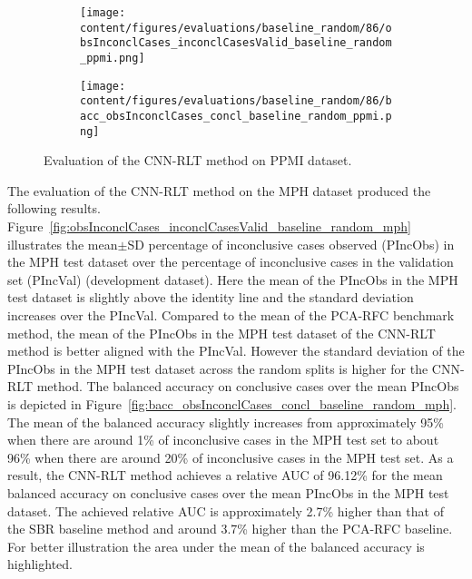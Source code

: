 \begin{figure}[ht]
  \begin{subfigure}{0.9\textwidth}
    \centering
    \texttt{[image: content/figures/evaluations/baseline\_random/86/obsInconclCases\_inconclCasesValid\_baseline\_random\_ppmi.png]}
    \label{fig:obsInconclCases_inconclCasesValid_baseline_random_ppmi}
  \end{subfigure}
  \hfill
  \begin{subfigure}{0.9\textwidth}
    \centering
    \texttt{[image: content/figures/evaluations/baseline\_random/86/bacc\_obsInconclCases\_concl\_baseline\_random\_ppmi.png]}
    \label{fig:bacc_obsInconclCases_concl_baseline_random_ppmi}
  \end{subfigure}
  \caption{Evaluation of the CNN-RLT method on PPMI dataset.}
  \label{fig:perf_eval_rlt_ppmi}
\end{figure}




The evaluation of the CNN-RLT method on the MPH dataset produced the following results.
Figure~\ref{fig:obsInconclCases_inconclCasesValid_baseline_random_mph} illustrates
the mean$\pm$SD percentage of inconclusive cases observed (PIncObs) in the MPH test dataset 
over the percentage of inconclusive cases in the validation set (PIncVal) (development dataset).
Here the mean of the PIncObs in the MPH test dataset is slightly above the identity line 
and the standard deviation increases over the PIncVal.
Compared to the mean of the PCA-RFC benchmark method, 
the mean of the PIncObs in the MPH test dataset of the CNN-RLT method is better aligned with the PIncVal.
However the standard deviation of the PIncObs in the MPH test dataset across the random splits 
is higher for the CNN-RLT method.
The balanced accuracy on conclusive cases over the mean PIncObs is depicted 
in Figure~\ref{fig:bacc_obsInconclCases_concl_baseline_random_mph}.
The mean of the balanced accuracy slightly increases from approximately 95\% 
when there are around 1\% of inconclusive cases in the MPH test set to about 96\% 
when there are around 20\% of inconclusive cases in the MPH test set.
As a result, the CNN-RLT method achieves a relative AUC of 96.12\% for the mean balanced accuracy on conclusive cases 
over the mean PIncObs in the MPH test dataset.
The achieved relative AUC is approximately 2.7\% higher than that of the SBR baseline method 
and around 3.7\% higher than the PCA-RFC baseline.
For better illustration the area under the mean of the balanced accuracy is highlighted.


